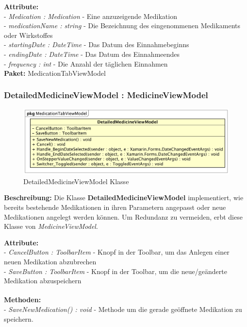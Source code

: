 \documentclass[a4paper]{scrreprt}
\begin{document}
\textbf{Attribute:}\\
- \textit{Medication : Medication} - Eine anzuzeigende Medikation\\
- \textit{medicationName : string} - Die Bezeichnung des eingenommenen Medikaments oder Wirkstoffes\\
- \textit{startingDate : DateTime} - Das Datum des Einnahmebeginns\\
- \textit{endingDate : DateTime} - Das Datum des Einnahmeendes\\
- \textit{frequency : int} - Die Anzahl der täglichen Einnahmen\\

\textbf{Paket:} MedicationTabViewModel

\subsubsection{DetailedMedicineViewModel : MedicineViewModel}
\begin{figure}[H]
\centering
\includegraphics[width=0.75\textheight]{graphics/Klassendiagramme/ViewModel/DetailedMedicineViewModel.png}
\caption{DetailedMedicineViewModel Klasse}
\end{figure}

\textbf{Beschreibung:} Die Klasse \textbf{DetailedMedicineViewModel} implementiert, wie bereits bestehende Medikationen in ihren Parametern angepasst oder neue Medikationen angelegt werden können. Um Redundanz zu vermeiden, erbt diese Klasse von \textit{MedicineViewModel}.

\textbf{Attribute:}\\
- \textit{CancelButton : ToolbarItem} - Knopf in der Toolbar, um das Anlegen einer neuen Medikation abzubrechen\\
- \textit{SaveButton : ToolbarItem} - Knopf in der Toolbar, um die neue/geänderte Medikation abzuspeichern\\
\\

\textbf{Methoden:}\\
- \textit{SaveNewMedication() : void} - Methode um die gerade geöffnete Medikation zu speichern.
\end{document}
